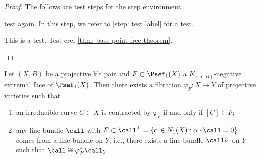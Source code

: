    \begin{proof}
        The follows are test steps for the step environment.
        \begin{step}
            test again.
            In this step, we refer to \ref{step: test label} for a test.
        \end{step}
        \begin{step}
            This is a test.
            Test cref \cref{thm: base point free theorem}.
        \end{step}
    \end{proof}

    \begin{theorem}\label{thm: contraction theorem}
        Let \((X,B)\) be a projective klt pair and \(F \subset \Psef_1(X)\) a \(K_{(X,B)}\)-negative extremal face of \(\Psef_1(X)\).
        Then there exists a fibration \(\varphi_F: X \to Y\) of projective varieties such that
        \begin{enumerate}
            \item an irreducible curve \(C \subset X\) is contracted by \(\varphi_F\) if and only if \([C] \in F\);
            \item any line bundle \(\call\) with \(F \subset \call^{\perp} = \{\alpha \in N_1(X) : \alpha \cdot \call = 0\}\) comes from a line bundle on \(Y\), 
                i.e., there exists a line bundle \(\call_Y\) on \(Y\) such that \(\call \cong \varphi_F^* \call_Y\).
        \end{enumerate}
    \end{theorem}

    